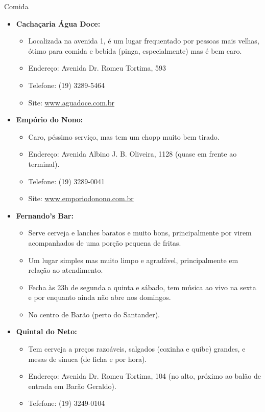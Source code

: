 \begin{story}{Comida}
\begin{itemize}
\item \textbf{Cachaçaria Água Doce:}
\begin{itemize}
\item Localizada na avenida 1, é um lugar frequentado por pessoas mais velhas, ótimo para comida e bebida (pinga, especialmente) mas é bem caro.
\item Endereço: Avenida Dr. Romeu Tortima, 593
\item Telefone: (19) 3289-5464
\item Site: \url{www.aguadoce.com.br}
\end{itemize}

\item \textbf{Empório do Nono:}
\begin{itemize}
\item Caro, péssimo serviço, mas tem um chopp muito bem tirado.
\item Endereço: Avenida Albino J. B. Oliveira, 1128 (quase em frente ao terminal).
\item Telefone: (19) 3289-0041
\item Site: \url{www.emporiodonono.com.br}
\end{itemize}

\item \textbf{Fernando's Bar:}
\begin{itemize}
\item Serve cerveja e lanches baratos e muito bons, principalmente por virem acompanhados de uma porção pequena de fritas.
\item Um lugar simples mas muito limpo e agradável, principalmente em relação ao atendimento.
\item Fecha às 23h de segunda a quinta e sábado, tem música ao vivo na sexta e por enquanto ainda não abre nos domingos.
\item No centro de Barão (perto do Santander).
\end{itemize}

\item \textbf{Quintal do Neto:}
\begin{itemize}
\item Tem cerveja a preços razoáveis, salgados (coxinha e quibe) grandes, e mesas de sinuca (de ficha e por hora).
\item Endereço: Avenida Dr. Romeu Tortima, 104 (no alto, próximo ao balão de entrada em Barão Geraldo).
\item Tefefone: (19) 3249-0104
\end{itemize}


\end{itemize}
\end{story}
